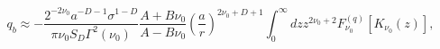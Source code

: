 \begin{equation}
q_{b}\approx -\frac{2^{-2\nu _{0}}a^{-D-1}\sigma ^{1-D}}{\pi \nu
_{0}S_{D}\Gamma ^{2}(\nu _{0})}\frac{A+B\nu _{0}}{A-B\nu
_{0}}\left( \frac{a }{r}\right) ^{2\nu _{0}+D+1}\int_{0}^{\infty
}dzz^{2\nu _{0}+2}F_{\nu _{0}}^{(q)}[K_{\nu _{0}}(z)],
\label{relfarDq}
\end{equation}

